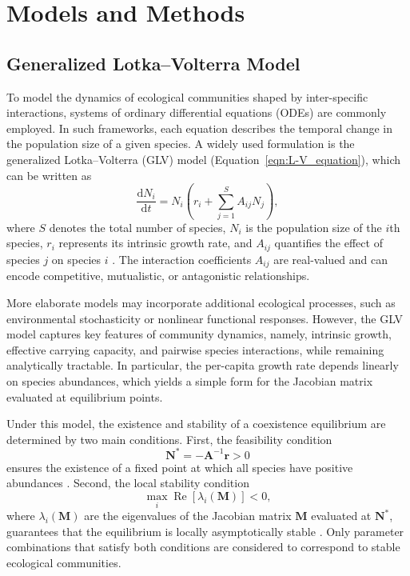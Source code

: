 \section{Models and Methods}

\subsection{Generalized Lotka--Volterra Model}

    To model the dynamics of ecological communities shaped by inter-specific interactions, systems of ordinary differential equations (ODEs) are commonly employed. In such frameworks, each equation describes the temporal change in the population size of a given species. A widely used formulation is the generalized Lotka--Volterra (GLV) model (Equation~\ref{eqn:L-V_equation}), which can be written as
    \begin{equation}\label{eqn:L-V_equation}
        \frac{\mathrm{d} N_i}{\mathrm{d} t} = N_i \left( r_i + \sum_{j=1}^{S} A_{ij} N_j \right),
    \end{equation}
    where $S$ denotes the total number of species, $N_i$ is the population size of the $i$th species, $r_i$ represents its intrinsic growth rate, and $A_{ij}$ quantifies the effect of species $j$ on species $i$ \citep{case_illustrated_2000}. The interaction coefficients $A_{ij}$ are real-valued and can encode competitive, mutualistic, or antagonistic relationships.

    More elaborate models may incorporate additional ecological processes, such as environmental stochasticity or nonlinear functional responses. However, the GLV model captures key features of community dynamics, namely, intrinsic growth, effective carrying capacity, and pairwise species interactions, while remaining analytically tractable. In particular, the per-capita growth rate depends linearly on species abundances, which yields a simple form for the Jacobian matrix evaluated at equilibrium points.

    Under this model, the existence and stability of a coexistence equilibrium are determined by two main conditions. First, the feasibility condition
    \begin{equation}
        \boldsymbol{N}^* = -\boldsymbol{A}^{-1}\boldsymbol{r} > 0
    \end{equation}
    ensures the existence of a fixed point at which all species have positive abundances \citep{pastur_spectrum_1972, allesina_stability_2012,rohr_structural_2014,song_will_2018}. Second, the local stability condition
    \begin{equation}
        \max_i \operatorname{Re} \left[ \lambda_i(\boldsymbol{M}) \right] < 0,
    \end{equation}
    where $\lambda_i(\boldsymbol{M})$ are the eigenvalues of the Jacobian matrix $\boldsymbol{M}$ evaluated at $\boldsymbol{N}^*$, guarantees that the equilibrium is locally asymptotically stable \citep{tao_random_2010, allesina_stability_2012}. Only parameter combinations that satisfy both conditions are considered to correspond to stable ecological communities.

